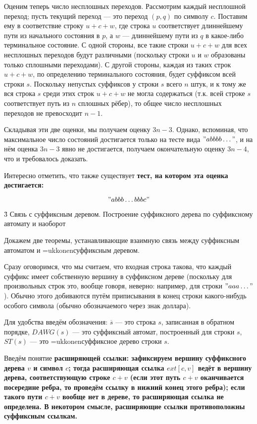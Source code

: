 Оценим теперь число несплошных переходов. Рассмотрим каждый несплошной переход; пусть текущий переход --- это переход $(p,q)$ по символу $c$. Поставим ему в соответствие строку $u+c+w$, где строка $u$ соответствует длиннейшему пути из начального состояния в $p$, а $w$ --- длиннейшему пути из $q$ в какое-либо терминальное состояние. С одной стороны, все такие строки $u+c+w$ для всех несплошных переходов будут различными (поскольку строки $u$ и $w$ образованы только сплошными переходами). С другой стороны, каждая из таких строк $u+c+w$, по определению терминального состояния, будет суффиксом всей строки $s$. Поскольку непустых суффиксов у строки $s$ всего $n$ штук, и к тому же вся строка $s$ среди этих строк $u+c+w$ не могла содержаться (т.к. всей строке $s$ соответствует путь из $n$ сплошных рёбер), то общее число несплошных переходов не превосходит $n-1$.

Складывая эти две оценки, мы получаем оценку $3n-3$. Однако, вспоминая, что максимальное число состояний достигается только на тесте вида $"abbbb \ldots "$, и на нём оценка $3n-3$ явно не достигается, получаем окончательную оценку $3n-4$, что и требовалось доказать.

Интересно отметить, что также существует \bf{тест, на котором эта оценка достигается}:

$$ "abbb \ldots bbbc" $$


\h3{ Связь с суффиксным деревом. Построение суффиксного дерева по суффиксному автомату и наоборот }

Докажем две теоремы, устанавливающие взаимную связь между суффиксным автоматом и \algohref=ukkonen{суффиксным деревом}.

Сразу оговоримся, что мы считаем, что входная строка такова, что каждый суффикс имеет собственную вершину в суффиксном дереве (поскольку для произвольных строк это, вообще говоря, неверно: например, для строки $"aaa \ldots"$). Обычно этого добиваются путём приписывания в конец строки какого-нибудь особого символа (обычно обозначаемого через знак доллара).

Для удобства введём обозначения: $\overline{s}$ --- это строка $s$, записанная в обратном порядке, $DAWG(s)$ --- это суффиксный автомат, построенный для строки $s$, $ST(s)$ --- это \algohref=ukkonen{суффиксное дерево} строки $s$.

Введём понятие \bf{расширяющей ссылки}: зафиксируем вершину суффиксного дерева $v$ и символ $c$; тогда расширяющая ссылка $ext[c,v]$ ведёт в вершину дерева, соответствующую строке $c+v$ (если этот путь $c+v$ оканчивается посередине ребра, то проведём ссылку в нижний конец этого ребра); если такого пути $c+v$ вообще нет в дереве, то расширяющая ссылка не определена. В некотором смысле, расширяющие ссылки противоположны суффиксным ссылкам.

